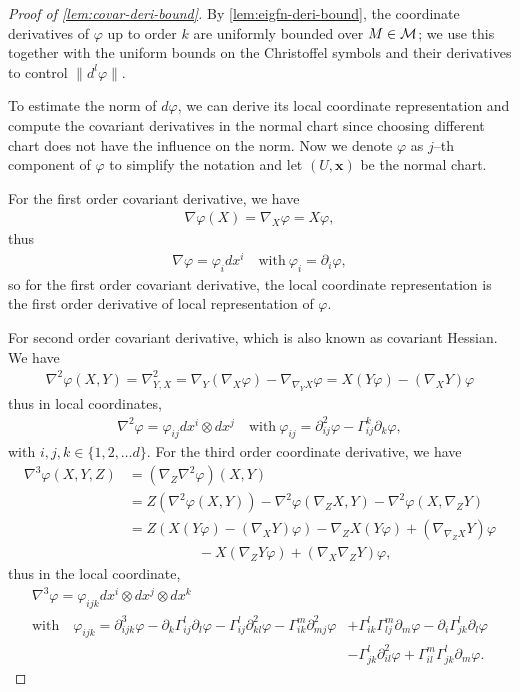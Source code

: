 \begin{proof}[Proof of \cref{lem:covar-deri-bound}]
By \cref{lem:eigfn-deri-bound}, the coordinate derivatives of $\varphi$ up to order $k$ are uniformly bounded over $M \in \mathcal{M}$; we use this together with the uniform bounds on the Christoffel symbols and their derivatives to control $\|d^l\varphi\|$.

To estimate the norm of $d\varphi$, we can derive its local coordinate representation and compute the covariant derivatives in the normal chart since  choosing different chart does not have the influence on the norm. Now we denote $\varphi$ as $j$--th component of $\varphi$ to simplify the notation and let $(U,\textbf{x})$ be the normal chart.

For the first order covariant derivative, we have
\begin{align}
	\nabla \varphi (X) = \nabla_X \varphi = X\varphi,
\end{align} 
thus 
\begin{align}
	\nabla \varphi = \varphi_i dx^i\quad  \text{with}\ \varphi_i = \partial_i \varphi,
\end{align}
so for the first order covariant derivative, the local coordinate representation is the first order derivative of local representation of $\varphi$.

For second order covariant derivative, which is also known as covariant Hessian. We have 
\begin{align}
\nabla^2 \varphi (X,Y)= \nabla^2_{Y,X}=\nabla_Y(\nabla_X \varphi)-\nabla_{\nabla_Y X}\varphi=X(Y\varphi)-(\nabla_X Y)\varphi
\end{align}
thus in local coordinates,
\begin{align}
	\nabla^2 \varphi = \varphi_{ij} dx^i \otimes dx^j \quad \text{with}\ \varphi_{ij}=\partial^2_{ij}\varphi-\Gamma^k_{ij}\partial_k \varphi,
\end{align}
%
with $i,j,k\in\{1,2,\ldots d\}$. 
For the third order coordinate derivative, we have 
\begin{align}
	\nabla^3 \varphi (X,Y,Z)&=(\nabla_Z \nabla^2 \varphi) (X,Y)\\
	&=Z(\nabla^2 \varphi (X,Y))-\nabla^2\varphi (\nabla_Z X,Y)-\nabla^2 \varphi (X,\nabla_Z Y)\\
	&=Z(X(Y\varphi)-(\nabla_X Y)\varphi)-\nabla_Z X(Y\varphi)+(\nabla_{\nabla_Z X} Y)\varphi \nonumber \\
	&\qquad\qquad \quad -X(\nabla_Z Y\varphi)+(\nabla_X \nabla_Z Y)\varphi,
\end{align}
thus in the local coordinate, 
\begin{align}
 \nabla^3 \varphi =\varphi_{ijk} dx^i \otimes dx^j \otimes dx^k &\\
 \text{with}\quad \varphi_{ijk}=\partial^3_{ijk} \varphi- \partial_k \Gamma_{ij}^l \partial_l \varphi - \Gamma_{ij}^l \partial^2_{kl}\varphi-\Gamma_{ik}^m\partial^2_{mj} \varphi&+ \Gamma_{ik}^l \Gamma_{lj}^m \partial_m \varphi-\partial_i \Gamma_{jk}^l \partial_l \varphi \nonumber\\
 & -\Gamma_{jk}^l \partial^2_{il}\varphi+ \Gamma_{il}^m\Gamma_{jk}^l\partial_m \varphi.
\end{align}


\end{proof}
